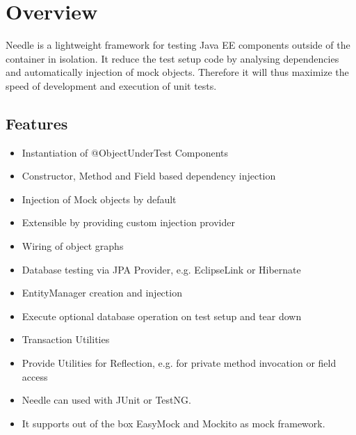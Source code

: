 \chapter{Overview}

Needle is a lightweight framework for testing Java EE components outside of the
container in isolation. It reduce the test setup code by analysing dependencies and
automatically injection of mock objects. Therefore it will thus maximize the speed of development and execution of unit tests.

\section{Features}
\begin{itemize}
	\item Instantiation of @ObjectUnderTest Components
	\item Constructor, Method and Field based dependency injection
	\item Injection of Mock objects by default
	\item Extensible by providing custom injection provider
	\item Wiring of object graphs

	\item Database testing via JPA Provider, e.g. EclipseLink or Hibernate
	\item EntityManager creation and injection
	\item Execute optional database operation on test setup and tear down
	\item Transaction Utilities

	\item Provide Utilities for Reflection, e.g. for private method invocation or field access

	\item Needle can used with JUnit or TestNG.
	\item It supports out of the box EasyMock and Mockito as mock framework.
\end{itemize}